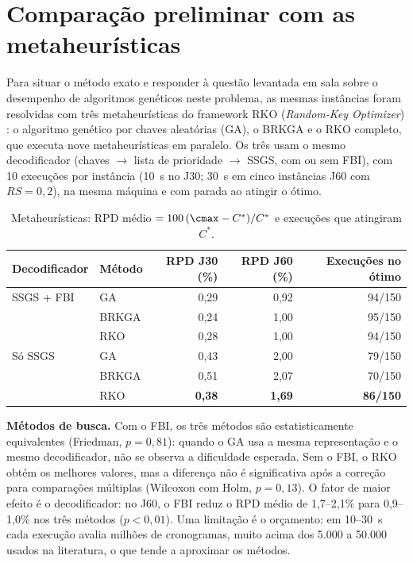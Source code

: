 
\section*{Comparação preliminar com as metaheurísticas}

Para situar o método exato e responder à questão levantada em sala sobre o desempenho de
algoritmos genéticos neste problema, as mesmas instâncias foram resolvidas com três metaheurísticas
do framework RKO (\emph{Random-Key Optimizer}) \cite{rko}: o algoritmo genético por chaves
aleatórias (GA), o BRKGA \cite{brkga} e o RKO completo, que executa nove metaheurísticas em
paralelo. Os três usam o mesmo decodificador (chaves $\to$ lista de prioridade $\to$ SSGS, com ou
sem FBI), com 10 execuções por instância (10~s no J30; 30~s em cinco instâncias J60 com $RS = 0{,}2$),
na mesma máquina e com parada ao atingir o ótimo.

\begin{table}[ht]
\centering
\small
\caption{Metaheurísticas: RPD médio $= 100\,(\cmax - C^*)/C^*$ e execuções que atingiram $C^*$.}
\label{tab:mh}
\begin{tabular}{llrrr}
\toprule
Decodificador & Método & RPD J30 (\%) & RPD J60 (\%) & Execuções no ótimo \\
\midrule
SSGS + FBI & GA    & 0,29 & 0,92 & 94/150 \\
           & BRKGA & 0,24 & 1,00 & 95/150 \\
           & RKO   & 0,28 & 1,00 & 94/150 \\
\midrule
Só SSGS    & GA    & 0,43 & 2,00 & 79/150 \\
           & BRKGA & 0,51 & 2,07 & 70/150 \\
           & RKO   & \textbf{0,38} & \textbf{1,69} & \textbf{86/150} \\
\bottomrule
\end{tabular}
\end{table}

\vspace{-0.4em}
\textbf{Métodos de busca.} Com o FBI, os três métodos são estatisticamente equivalentes
(Friedman, $p = 0{,}81$): quando o GA usa a mesma representação e o mesmo decodificador, não se
observa a dificuldade esperada. Sem o FBI, o RKO obtém os melhores valores, mas a diferença não é
significativa após a correção para comparações múltiplas (Wilcoxon com Holm, $p = 0{,}13$). O fator
de maior efeito é o decodificador: no J60, o FBI reduz o RPD médio de 1,7--2,1\% para 0,9--1,0\% nos três
métodos ($p < 0{,}01$). Uma limitação é o orçamento: em 10--30~s cada execução avalia milhões de
cronogramas, muito acima dos 5.000 a 50.000 usados na literatura, o que tende a aproximar os métodos.

